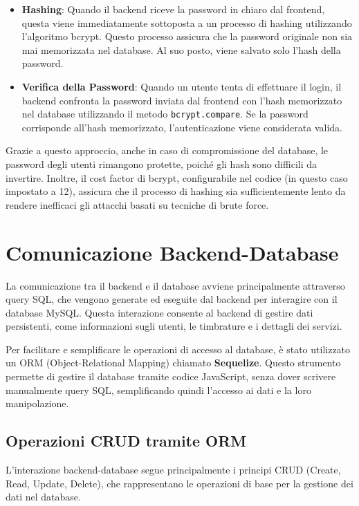 \documentclass[twoside]{supsistudent}
\begin{document}
\begin{itemize}
  \item \textbf{Hashing}: Quando il backend riceve la password in chiaro dal frontend, questa viene immediatamente sottoposta a un processo di hashing utilizzando l'algoritmo bcrypt. Questo processo assicura che la password originale non sia mai memorizzata nel database. Al suo posto, viene salvato solo l'hash della password.

  \item \textbf{Verifica della Password}: Quando un utente tenta di effettuare il login, il backend confronta la password inviata dal frontend con l'hash memorizzato nel database utilizzando il metodo \texttt{bcrypt.compare}. Se la password corrisponde all'hash memorizzato, l'autenticazione viene considerata valida.
\end{itemize}

Grazie a questo approccio, anche in caso di compromissione del database, le password degli utenti rimangono protette, poiché gli hash sono difficili da invertire. Inoltre, il cost factor di bcrypt, configurabile nel codice (in questo caso impostato a 12), assicura che il processo di hashing sia sufficientemente lento da rendere inefficaci gli attacchi basati su tecniche di brute force.


\section{Comunicazione Backend-Database}

La comunicazione tra il backend e il database avviene principalmente attraverso query SQL, che vengono generate ed eseguite dal backend per interagire con il database MySQL. Questa interazione consente al backend di gestire dati persistenti, come informazioni sugli utenti, le timbrature e i dettagli dei servizi.

Per facilitare e semplificare le operazioni di accesso al database, è stato utilizzato un ORM (Object-Relational Mapping) chiamato \textbf{Sequelize}. Questo strumento permette di gestire il database tramite codice JavaScript, senza dover scrivere manualmente query SQL, semplificando quindi l'accesso ai dati e la loro manipolazione.

\subsection{Operazioni CRUD tramite ORM}

L'interazione backend-database segue principalmente i principi CRUD (Create, Read, Update, Delete), che rappresentano le operazioni di base per la gestione dei dati nel database.
\end{document}
